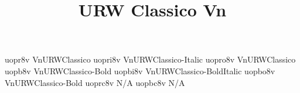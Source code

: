 \documentclass[test]{vnsample}
\title{URW Classico Vn}
\begin{document}
\begin{shortsample}
  {uopr8v}   {VnURWClassico}
 {uopri8v}  {VnURWClassico-Italic}
 {uopro8v}  {VnURWClassico}
  {uopb8v}   {VnURWClassico-Bold}
 {uopbi8v}  {VnURWClassico-BoldItalic}
 {uopbo8v}  {VnURWClassico-Bold}
 {uoprc8v}  {N/A}
 {uopbc8v}  {N/A}
\end{shortsample}
\end{document}
